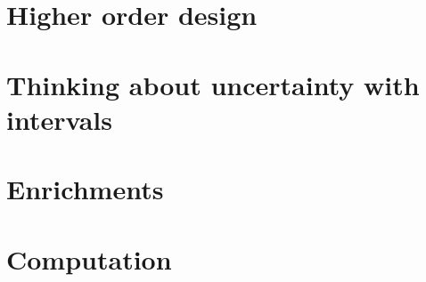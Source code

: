 \documentclass[paper=6in:9in,pagesize=pdftex,
 headinclude=off,footinclude=on,11pt,twoside]{scrbook}
\begin{document}
\chapter{Higher order design}

\clearpage

\chapter{Thinking about uncertainty with intervals}

\clearpage

\chapter{Enrichments}

\clearpage

\chapter{Computation}



%
%
%
%

\printbibliography
\end{document}
